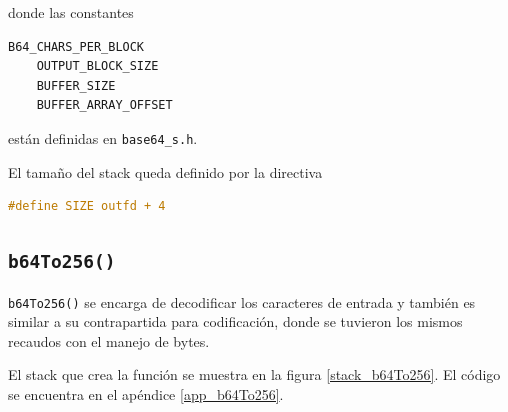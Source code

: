 	donde las constantes 
	\begin{lstlisting}[language=C, style=StyleC]
	B64_CHARS_PER_BLOCK
	OUTPUT_BLOCK_SIZE
	BUFFER_SIZE
	BUFFER_ARRAY_OFFSET
	\end{lstlisting}
	están definidas en \texttt{base64\_s.h}.
	
	El tamaño del stack queda definido por la directiva
	\begin{lstlisting}[language=C, style=StyleC]
	#define SIZE outfd + 4
	\end{lstlisting}
	
\subsection{\texttt{b64To256()}}

\texttt{b64To256()} se encarga de decodificar los caracteres de entrada y también es similar a su contrapartida para codificación, donde se tuvieron los mismos recaudos con el manejo de bytes.

El stack que crea la función se muestra en la figura \ref{stack_b64To256}. El código se encuentra en el apéndice \ref{app_b64To256}.

